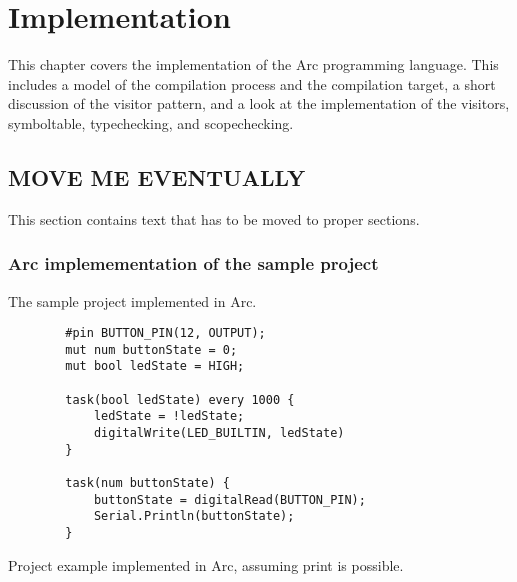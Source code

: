 \chapter{Implementation}\label{cha:implementation}
This chapter covers the implementation of the Arc programming language. This includes a model of the compilation process and the compilation target, a short discussion of the visitor pattern, and a look at the implementation of the visitors, symboltable, typechecking, and scopechecking.









\section{MOVE ME EVENTUALLY}
This section contains text that has to be moved to proper sections.

\subsection*{Arc implemementation of the sample project}
The sample project implemented in Arc.

\begin{listing}[htb!]
    \begin{verbatim}
        #pin BUTTON_PIN(12, OUTPUT);
        mut num buttonState = 0;
        mut bool ledState = HIGH;

        task(bool ledState) every 1000 {
            ledState = !ledState;
            digitalWrite(LED_BUILTIN, ledState)
        }

        task(num buttonState) {
            buttonState = digitalRead(BUTTON_PIN);
            Serial.Println(buttonState);
        }
    \end{verbatim}
    \caption{Project example implemented in Arc, assuming print is possible.}
    \label{lst:arcexample}
\end{listing}
